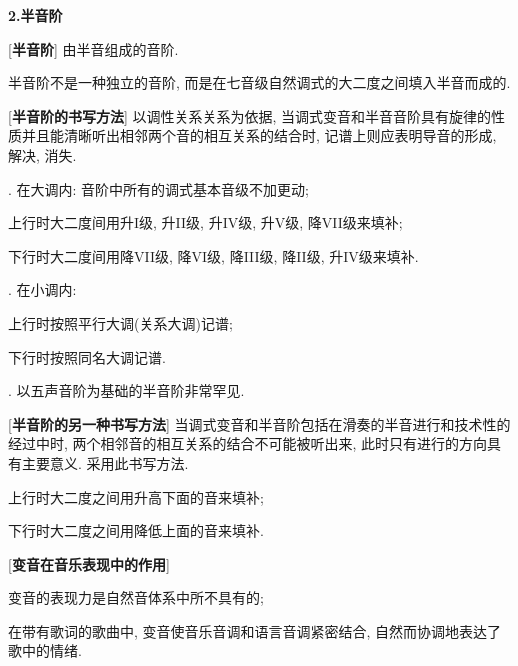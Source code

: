 \clearpage

\begin{center}
 \textbf{2.半音阶}\\
\end{center}

[\textbf{半音阶}] 由半音组成的音阶.\par
\qquad 半音阶不是一种独立的音阶, 而是在七音级自然调式的大二度之间填入半音而成的.\par

[\textbf{半音阶的书写方法}] 以调性关系关系为依据, 当调式变音和半音音阶具有旋律的性质并且能清晰听出相邻两个音的相互关系的结合时, 记谱上则应表明导音的形成, 解决, 消失. \par
{}. 在大调内: 音阶中所有的调式基本音级不加更动;\par
\qquad \qquad 上行时大二度间用升I级, 升II级, 升IV级, 升V级, 降VII级来填补; \par
\qquad \qquad 下行时大二度间用降VII级, 降VI级, 降III级, 降II级, 升IV级来填补.\par
{}. 在小调内: \par
\qquad \qquad 上行时按照平行大调(关系大调)记谱;\par
\qquad \qquad 下行时按照同名大调记谱.\par
{}. 以五声音阶为基础的半音阶非常罕见.\par

[\textbf{半音阶的另一种书写方法}] 当调式变音和半音阶包括在滑奏的半音进行和技术性的经过中时, 两个相邻音的相互关系的结合不可能被听出来, 此时只有进行的方向具有主要意义. 采用此书写方法.\par
\qquad 上行时大二度之间用升高下面的音来填补;\par
\qquad 下行时大二度之间用降低上面的音来填补.\par

[\textbf{变音在音乐表现中的作用}]\par
\qquad 变音的表现力是自然音体系中所不具有的;\par
\qquad 在带有歌词的歌曲中, 变音使音乐音调和语言音调紧密结合, 自然而协调地表达了歌中的情绪.\par


